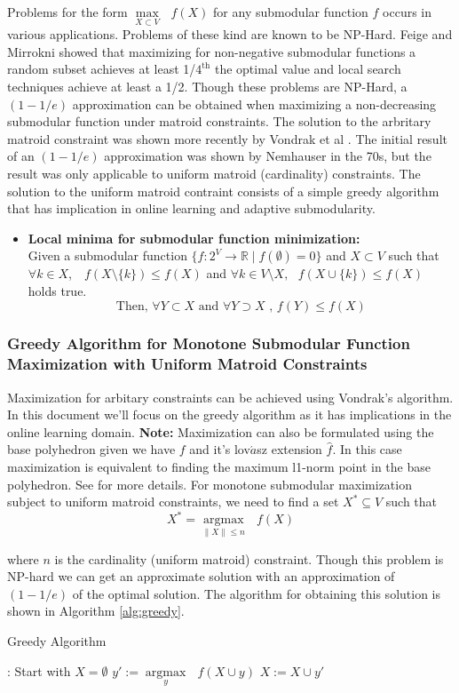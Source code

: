 Problems for the form $\underset{X\subset V}{\operatorname{max }}\text{ } f(X)$ for any submodular function $f$ occurs in various applications. Problems of these kind are known to be NP-Hard. Feige and Mirrokni \cite{Feige07maximizingnon-monotone} showed that maximizing for non-negative submodular functions a random subset achieves at least 1/$4^{\text{th}}$ the optimal value and local search techniques achieve at least a 1/2. Though these problems are NP-Hard, a $(1 - 1/e)$ approximation can be obtained when maximizing a non-decreasing submodular function under matroid constraints.
The solution to the arbritary matroid constraint was shown more recently by Vondrak et al \cite{Vondrak}. The initial result of an $(1 - 1/e)$ approximation was shown by Nemhauser  \cite{Nemhauser} in the 70s, but the result was only applicable to uniform matroid (cardinality) constraints. The solution to the uniform matroid contraint consists of a simple greedy algorithm that has implication in online learning and adaptive submodularity.
\begin{itemize}
 \item {\bf \lemma Local minima for submodular function minimization:} \\ Given a submodular function $\{f:2^V \rightarrow \mathds{R} \mid f(\emptyset) = 0\}$ and  $X \subset V$ such that $\forall k \in X$, $\text{ }f(X\setminus \{k\}) \leq f(X)$  and $\forall k \in V\setminus X, \text{ } f(X\cup \{k\}) \leq f(X)$ holds true.
 \[ \text{Then, } \forall Y\subset X \text{ and } \forall Y\supset X \text{ , }f(Y) \leq f(X) \] 
\end{itemize}
\subsubsection{Greedy Algorithm for Monotone Submodular Function Maximization with Uniform Matroid Constraints}
Maximization for arbitary constraints can be achieved using Vondrak's algorithm. In this document we'll focus on the greedy algorithm as it has implications in the online learning domain. {\bf Note:} Maximization can also be formulated using the base polyhedron given we have $f$ and it's lov$\acute{a}$sz extension $\hat{f}$. In this case maximization is equivalent to finding the maximum l1-norm point in the base polyhedron. See \cite{Bach} for more details.
For monotone submodular maximization subject to uniform matroid constraints, we need to find a set $X^*\subseteq V$ such that
\[
 X^* = \underset{\|X\| \leq n}{\operatorname{argmax }}\text{ }f(X)
\]

where $n$ is the cardinality (uniform matroid) constraint. Though this problem is NP-hard we can get an approximate solution with an approximation of $(1-1/e)$ of the optimal solution.  The algorithm for obtaining this solution is shown in Algorithm \ref{alg:greedy}.
\begin{algorithm}[htb]
\caption{Greedy Algorithm}
\label{alg:greedy}
\begin{algorithmic}[1]
\footnotesize
{}: Start with $X = \emptyset$
  \State $y':= \underset{y}{\operatorname{argmax }}\text{ }f(X\cup {y}) $
  \State $X := X \cup {y'}$
\EndFor
\end{algorithmic}
\end{algorithm}

